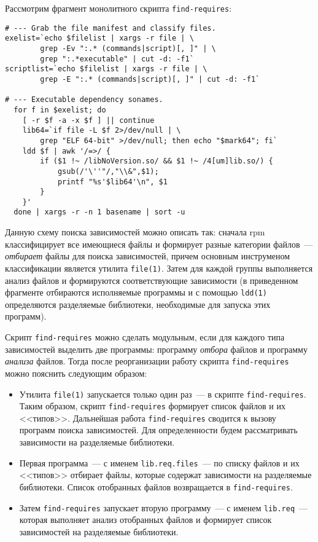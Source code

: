 \documentclass[russian,a4paper,12pt,titlepage]{article}
\begin{document}
Рассмотрим фрагмент монолитного скрипта \verb|find-requires|:
\begin{verbatim}
# --- Grab the file manifest and classify files.
exelist=`echo $filelist | xargs -r file | \
        grep -Ev ":.* (commands|script)[, ]" | \
        grep ":.*executable" | cut -d: -f1`
scriptlist=`echo $filelist | xargs -r file | \
        grep -E ":.* (commands|script)[, ]" | cut -d: -f1`

# --- Executable dependency sonames.
  for f in $exelist; do
    [ -r $f -a -x $f ] || continue
    lib64=`if file -L $f 2>/dev/null | \
        grep "ELF 64-bit" >/dev/null; then echo "$mark64"; fi`
    ldd $f | awk '/=>/ {
        if ($1 !~ /libNoVersion.so/ && $1 !~ /4[um]lib.so/) {
            gsub(/'\''"/,"\\&",$1);
            printf "%s'$lib64'\n", $1
        }
    }'
  done | xargs -r -n 1 basename | sort -u
\end{verbatim}
Данную схему поиска зависимостей можно описать так: сначала rpm классифицирует
все имеющиеся файлы и формирует разные категории файлов~--- \textit{отбирает} файлы
для поиска зависимостей, причем основным инструменом классификации является утилита \verb|file(1)|.
Затем для каждой группы выполняется анализ файлов и формируются соответствующие зависимости (в
приведенном фрагменте отбираются исполняемые программы и с помощью \verb|ldd(1)| определяются
разделяемые библиотеки, необходимые для запуска этих программ).

Скрипт \verb|find-requires| можно сделать модульным, если для каждого типа зависимостей выделить
две программы: программу \textit{отбора} файлов и программу \textit{анализа} файлов.  Тогда после реорганизации
работу скрипта \verb|find-requires| можно пояснить следующим образом:
\begin{itemize}
\item Утилита \verb|file(1)| запускается только один раз~--- в скрипте \verb|find-requires|.  Таким образом,
скрипт \verb|find-requires| формирует список файлов и их <<типов>>.  Дальнейшая работа \verb|find-requires|
сводится к вызову программ поиска зависимостей.  Для определенности будем рассматривать зависимости на разделяемые библиотеки.
\item Первая программа~--- с именем \verb|lib.req.files|~--- по списку файлов и их <<типов>> отбирает файлы,
которые содержат зависимости на разделяемые библиотеки.  Список отобранных файлов возвращается в \verb|find-requires|.
\item Затем \verb|find-requires| запускает вторую программу~--- с именем \verb|lib.req|~--- которая выполняет
анализ отобранных файлов и формирует список зависимостей на разделяемые библиотеки.
\end{itemize}
\end{document}
